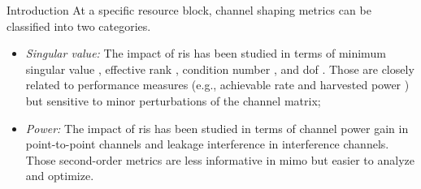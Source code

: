\documentclass[journal]{IEEEtran}
\begin{document}
\begin{section}{Introduction}
		At a specific resource block, channel shaping metrics can be classified into two categories.
		\begin{itemize}
			\item \emph{Singular value:} The impact of \gls{ris} has been studied in terms of minimum singular value \cite{ElMossallamy2021}, effective rank \cite{ElMossallamy2021,Meng2023}, condition number \cite{Zheng2022,Huang2023}, and \gls{dof} \cite{Bafghi2022,Zheng2023,Chae2023}. Those are closely related to performance measures (e.g., achievable rate and harvested power \cite{Shen2021}) but sensitive to minor perturbations of the channel matrix;
			\item \emph{Power:} The impact of \gls{ris} has been studied in terms of channel power gain \cite{Wu2019,Shen2020a,Nerini2023,Nerini2024,Santamaria2023} in point-to-point channels and leakage interference \cite{Santamaria2023a} in interference channels. Those second-order metrics are less informative in \gls{mimo} but easier to analyze and optimize.
		\end{itemize}


\end{section}
\end{document}
